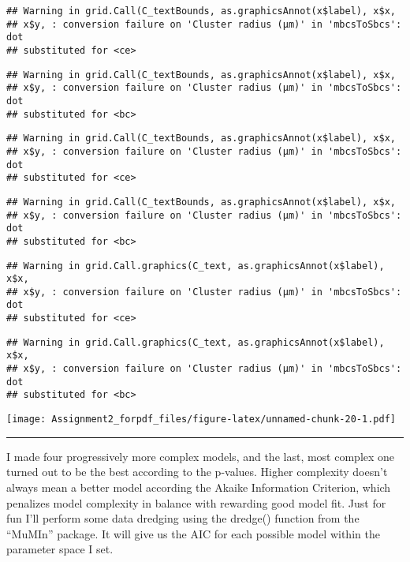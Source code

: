 \documentclass[]{article}
\begin{document}
\begin{verbatim}
## Warning in grid.Call(C_textBounds, as.graphicsAnnot(x$label), x$x,
## x$y, : conversion failure on 'Cluster radius (μm)' in 'mbcsToSbcs': dot
## substituted for <ce>
\end{verbatim}

\begin{verbatim}
## Warning in grid.Call(C_textBounds, as.graphicsAnnot(x$label), x$x,
## x$y, : conversion failure on 'Cluster radius (μm)' in 'mbcsToSbcs': dot
## substituted for <bc>
\end{verbatim}

\begin{verbatim}
## Warning in grid.Call(C_textBounds, as.graphicsAnnot(x$label), x$x,
## x$y, : conversion failure on 'Cluster radius (μm)' in 'mbcsToSbcs': dot
## substituted for <ce>
\end{verbatim}

\begin{verbatim}
## Warning in grid.Call(C_textBounds, as.graphicsAnnot(x$label), x$x,
## x$y, : conversion failure on 'Cluster radius (μm)' in 'mbcsToSbcs': dot
## substituted for <bc>
\end{verbatim}

\begin{verbatim}
## Warning in grid.Call.graphics(C_text, as.graphicsAnnot(x$label), x$x,
## x$y, : conversion failure on 'Cluster radius (μm)' in 'mbcsToSbcs': dot
## substituted for <ce>
\end{verbatim}

\begin{verbatim}
## Warning in grid.Call.graphics(C_text, as.graphicsAnnot(x$label), x$x,
## x$y, : conversion failure on 'Cluster radius (μm)' in 'mbcsToSbcs': dot
## substituted for <bc>
\end{verbatim}

\texttt{[image: Assignment2\_forpdf\_files/figure-latex/unnamed-chunk-20-1.pdf]}

\begin{center}\rule{0.5\linewidth}{\linethickness}\end{center}

I made four progressively more complex models, and the last, most
complex one turned out to be the best according to the p-values. Higher
complexity doesn't always mean a better model according the Akaike
Information Criterion, which penalizes model complexity in balance with
rewarding good model fit. Just for fun I'll perform some data dredging
using the dredge() function from the ``MuMIn'' package. It will give us
the AIC for each possible model within the parameter space I set.
\end{document}
